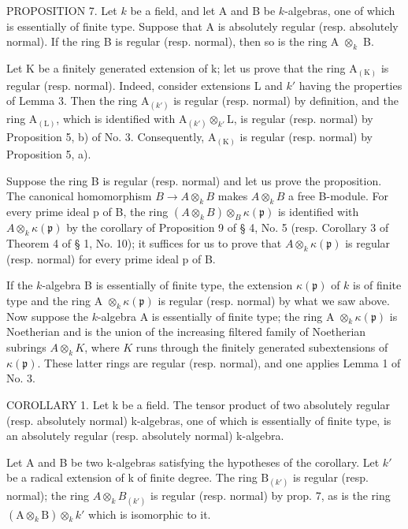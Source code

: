 PROPOSITION 7. Let \(k\) be a field, and let A and B be \(k\)-algebras, one of which is essentially of finite type. Suppose that A is absolutely regular (resp. absolutely normal). If the ring B is regular (resp. normal), then so is the ring A \(\otimes_{k}\) B.

Let K be a finitely generated extension of k; let us prove that the ring \(\mathrm{A}_{(\mathrm{K})}\) is regular (resp. normal). Indeed, consider extensions L and \(k'\) having the properties of Lemma 3. Then the ring \(\mathrm{A}_{(k')}\) is regular (resp. normal) by definition, and the ring \(\mathrm{A}_{(\mathrm{L})}\), which is identified with \(\mathrm{A}_{(k')} \otimes_{k'} \mathrm{L}\), is regular (resp. normal) by Proposition 5, b) of No. 3. Consequently, \(\mathrm{A}_{(\mathrm{K})}\) is regular (resp. normal) by Proposition 5, a).

Suppose the ring B is regular (resp. normal) and let us prove the proposition. The canonical homomorphism \(B \to A \otimes_{k} B\) makes \(A \otimes_{k} B\) a free B-module. For every prime ideal p of B, the ring \((A \otimes_{k} B) \otimes_{B} \kappa(\mathfrak{p})\) is identified with \(A \otimes_{k} \kappa(\mathfrak{p})\) by the corollary of Proposition 9 of § 4, No. 5 (resp. Corollary 3 of Theorem 4 of § 1, No. 10); it suffices for us to prove that \(A \otimes_{k} \kappa(\mathfrak{p})\) is regular (resp. normal) for every prime ideal p of B.

If the \(k\)-algebra B is essentially of finite type, the extension \(\kappa(\mathfrak{p})\) of \(k\) is of finite type and the ring A \(\otimes_k \kappa(\mathfrak{p})\) is regular (resp. normal) by what we saw above. Now suppose the \(k\)-algebra A is essentially of finite type; the ring A \(\otimes_k \kappa(\mathfrak{p})\) is Noetherian and is the union of the increasing filtered family of Noetherian subrings \(A \otimes_k K\), where \(K\) runs through the finitely generated subextensions of \(\kappa(\mathfrak{p})\). These latter rings are regular (resp. normal), and one applies Lemma 1 of No. 3.

COROLLARY 1. Let k be a field. The tensor product of two absolutely regular (resp. absolutely normal) k-algebras, one of which is essentially of finite type, is an absolutely regular (resp. absolutely normal) k-algebra.

Let A and B be two k-algebras satisfying the hypotheses of the corollary. Let \(k'\) be a radical extension of k of finite degree. The ring \(\mathrm{B}_{(k')}\) is regular (resp. normal); the ring \(A \otimes_{k} B_{(k')}\) is regular (resp. normal) by prop. 7, as is the ring \((\mathrm{A} \otimes_{k} \mathrm{B}) \otimes_{k} k'\) which is isomorphic to it.

